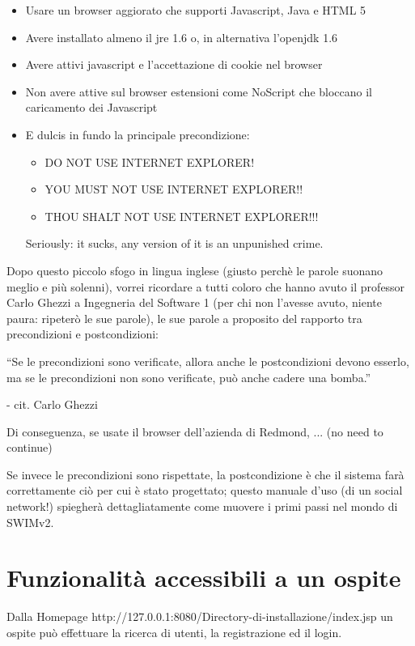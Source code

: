 \documentclass[a4paper,12pt]{article}
\begin{document}
\begin{itemize}
 \item Usare un browser aggiorato che supporti Javascript, Java e HTML 5
 \item Avere installato almeno il jre 1.6 o, in alternativa l'openjdk 1.6
 \item Avere attivi javascript e l'accettazione di cookie nel browser
 \item Non avere attive sul browser estensioni come NoScript che bloccano il caricamento dei Javascript
 \item E dulcis in fundo la principale precondizione:
 \begin{itemize}
  \item DO NOT USE INTERNET EXPLORER!
  \item YOU MUST NOT USE INTERNET EXPLORER!!
  \item THOU SHALT NOT USE INTERNET EXPLORER!!!
 \end{itemize}
 Seriously: it sucks, any version of it is an unpunished crime.
\end{itemize}
Dopo questo piccolo sfogo in lingua inglese (giusto perchè le parole suonano meglio e più solenni), vorrei ricordare a tutti coloro che hanno avuto il professor Carlo Ghezzi a Ingegneria del Software 1 (per chi non l'avesse avuto, niente paura: ripeterò le
sue parole), le sue parole a proposito del rapporto tra precondizioni e postcondizioni: \linebreak

``Se le precondizioni sono verificate, allora anche le postcondizioni devono esserlo, ma se le precondizioni non sono verificate, può anche cadere una bomba.'' 
\linebreak

- cit. Carlo Ghezzi


\vspace{0.5cm}
Di conseguenza, se usate il browser dell'azienda di Redmond, ... (no need to continue)

Se invece le precondizioni sono rispettate, la postcondizione è che il sistema farà correttamente ciò per cui è stato progettato; questo manuale d'uso (di un social network!) spiegherà dettagliatamente come
muovere i primi passi nel mondo di SWIMv2.

\pagebreak

\section{Funzionalità accessibili a un ospite}
Dalla Homepage http://127.0.0.1:8080/Directory-di-installazione/index.jsp un ospite può effettuare la ricerca di utenti, la registrazione ed il login.
\end{document}
